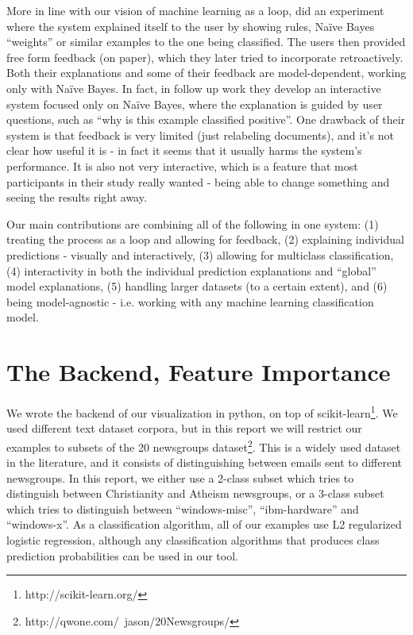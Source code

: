 \documentclass{chi2009}
\begin{document}
More in line with our vision of machine learning as a loop,
\cite{Stumpf:2009:IMM:1555003.1555106} did an experiment where the system
explained itself to the user by showing rules, Na\"{i}ve Bayes ``weights'' or
similar examples to the one being classified. The users then provided free form
feedback (on paper), which they later tried to incorporate retroactively. Both
their explanations and some of their feedback are model-dependent, working only
with Na\"{i}ve Bayes. In fact, in follow up work
\cite{Kulesza:2011:WED:2030365.2030367} they develop an interactive system
focused only on Na\"{i}ve Bayes, where the explanation is guided by user questions,
such as ``why is this example classified positive''. One drawback of their
system is that feedback is very limited (just relabeling documents), and it's
not clear how useful it is - in fact it seems that it usually harms the
system's performance. It is also not very interactive, which is a feature that
most participants in their study really wanted - being able to change something
and seeing the results right away. 

Our main contributions are combining all of the following in one system: (1)
treating the process as a loop and allowing for feedback, (2) explaining individual
predictions - visually and interactively, (3) allowing for multiclass
classification, (4) interactivity in both the individual prediction explanations
and ``global'' model explanations, (5) handling larger datasets (to a certain
extent), and (6) being model-agnostic - i.e. working with any machine learning
classification model.
\pagebreak

\section{The Backend, Feature Importance}
We wrote the backend of our visualization in python, on top of
scikit-learn\footnote{http://scikit-learn.org/}. We used different text dataset
corpora, but in this report we will restrict our examples to subsets of the 20
newsgroups dataset\footnote{http://qwone.com/~jason/20Newsgroups/}. This is a
widely used dataset in the literature, and it consists of distinguishing between
emails sent to different newsgroups. In this report, we either use a 2-class
subset which tries to distinguish between Christianity and Atheism newsgroups,
or a 3-class subset which tries to distinguish between ``windows-misc'',
``ibm-hardware'' and ``windows-x''. As a classification algorithm, all of our
examples use L2 regularized logistic regression, although any classification
algorithms that produces class prediction probabilities can be used in our tool.
\end{document}
